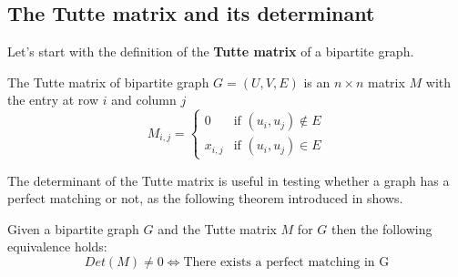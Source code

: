 \subsection{The Tutte matrix and its determinant}
Let's start with the definition of the \textbf{Tutte matrix} of a bipartite graph.
\begin{definition} \label{def:tutte_matrix}
    The Tutte matrix of bipartite graph $G = (U, V, E)$ is an $n \times n$ matrix $M$ with the entry at row $i$ and column $j$
    \begin{equation}
        M_{i,j} =
        \begin{cases}
            0 & \text{if } (u_i, u_j) \notin E \\
            x_{i,j} & \text{if } (u_i, u_j) \in E
        \end{cases}
    \end{equation}

\end{definition}

The determinant of the Tutte matrix is useful in testing whether a graph has a perfect matching or not, as the following theorem introduced in \cite{lovasz1979matching} shows. 

\begin{theorem} \label {thm:perfect_matching_existence}
    Given a bipartite graph $G$ and the Tutte matrix $M$ for $G$ then the following equivalence holds:
    $$
    Det(M) \neq 0 \iff \text{There exists a perfect matching in G}
    $$
\end{theorem}

